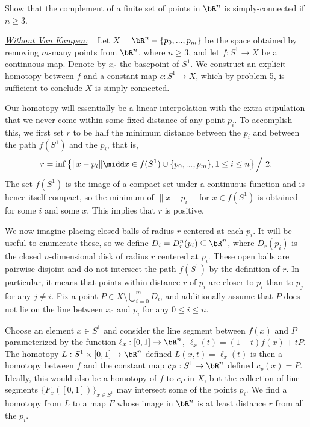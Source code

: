 \begin{homework}[e]
 Show that the complement of a finite set of points in $\bR^n$ is simply-connected if $n \geq 3$.

\begin{prf}
  \underline{\emph{Without Van Kampen:}} ~ Let $X = \bR^n - \{p_0,...,p_m\}$ be the space obtained by removing $m$-many points from $\bR^n$, where $n \geq 3$, and let $f:S^1\to X$ be a continuous map. Denote by $x_0$ the basepoint of $S^1$. We construct an explicit homotopy between $f$ and a constant map $c:S^1 \to X$, which by problem 5, is sufficient to conclude $X$ is simply-connected.

  Our homotopy will essentially be a linear interpolation with the extra stipulation that we never come within some fixed distance of any point $p_i$. To accomplish this, we first set $r$ to be half the minimum distance between the $p_i$ and between the path $f(S^1)$ and the $p_i$, that is,
  \begin{align*}
    r = \inf \left\{\|x - p_i\| \midd x \in f(S^1) \cup \{p_0,...,p_m\}, 1\leq i\leq n\right\}\Big/~2.
  \end{align*}
  The set $f(S^1)$ is the image of a compact set under a continuous function and is hence itself compact, so the minimum of $\|x - p_i\|$ for $x \in f(S^1)$ is obtained for some $i$ and some $x$. This implies that $r$ is positive. 

  We now imagine placing closed balls of radius $r$ centered at each $p_i$. It will be useful to enumerate these, so we define $D_i = D_r^n(p_i) \subseteq \bR^n$, where $D_r(p_i)$ is the closed $n$-dimensional disk of radius $r$ centered at $p_i$. These open balls are pairwise disjoint and do not intersect the path $f(S^1)$ by the definition of $r$. In particular, it means that points within distance $r$ of $p_i$ are closer to $p_i$ than to $p_j$ for any $j \neq i$. Fix a point $P \in X \setminus \bigcup_{i = 0}^m D_i$, and additionally assume that $P$ does not lie on the line between $x_0$ and $p_i$ for any $0\leq i\leq n$.

  Choose an element $x\in S^1$ and consider the line segment between $f(x)$ and $P$ parameterized by the function $\ell_x:[0,1]\to \bR^n$, $\ell_x(t) = (1-t)f(x) + tP$. The homotopy $L:S^1\times [0,1] \to \bR^n$ defined $L(x,t) = \ell_x(t)$ is then a homotopy between $f$ and the constant map $c_P:S^1 \to \bR^n$ defined $c_p(x) = P$. Ideally, this would also be a homotopy of $f$ to $c_P$ in $X$, but the collection of line segments $\{F_x([0,1])\}_{x\in S^1}$ may intersect some of the points $p_i$. We find a homotopy from $L$ to a map $F$ whose image in $\bR^n$ is at least distance $r$ from all the $p_i$.


\end{prf}
\end{homework}
